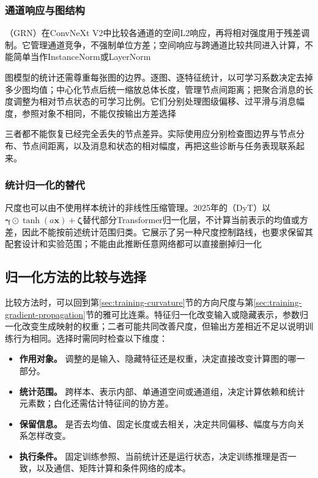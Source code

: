 \subsubsection{通道响应与图结构}
\label{sec:training-grn-qknorm}
\label{sec:training-graph-temporal-norm}
\label{sec:training-global-response-normalization}
（GRN）在ConvNeXt V2中比较各通道的空间L2响应，再将相对强度用于残差调制。它管理通道竞争，不强制单位方差；空间响应与跨通道比较共同进入计算，不能简单当作InstanceNorm或LayerNorm

图模型的统计还需尊重每张图的边界。逐图、逐特征统计，以可学习系数决定去掉多少图均值；中心化节点后统一缩放总体长度，管理节点间距离；把聚合消息的长度调整为相对节点状态的可学习比例。它们分别处理图级偏移、过平滑与消息幅度，参照对象不相同，不能仅按输出方差选择

三者都不能恢复已经完全丢失的节点差异。实际使用应分别检查图边界与节点分布、节点间距离，以及消息和状态的相对幅度，再把这些诊断与任务表现联系起来。

\subsubsection{统计归一化的替代}
\label{sec:training-normalization-substitutes}
尺度也可以由不使用样本统计的非线性压缩管理。2025年的（DyT）以$\bm\gamma\odot\tanh(a\bm x)+\bm\zeta$替代部分Transformer归一化层，不计算当前表示的均值或方差，因此不能按前述统计范围归类。它展示了另一种尺度控制路线，也要求保留其配套设计和实验范围；不能由此推断任意网络都可以直接删掉归一化

\subsection{归一化方法的比较与选择}
\label{sec:training-normalization-comparison}
比较方法时，可以回到第\ref{sec:training-curvature}节的方向尺度与第\ref{sec:training-gradient-propagation}节的雅可比连乘。特征归一化改变输入或隐藏表示，参数归一化改变生成映射的权重；二者可能共同改善尺度，但输出方差相近不足以说明训练行为相同。选择时需同时检查以下维度：
\begin{itemize}
  \item \textbf{作用对象。} 调整的是输入、隐藏特征还是权重，决定直接改变计算图的哪一部分。
  \item \textbf{统计范围。} 跨样本、表示内部、单通道空间或通道组，决定计算依赖和统计元素数；白化还需估计特征间的协方差。
  \item \textbf{保留信息。} 是否去均值、固定长度或去相关，决定共同偏移、幅度与方向关系怎样改变。
  \item \textbf{执行条件。} 固定训练参照、当前统计还是运行状态，决定训练推理是否一致，以及通信、矩阵计算和条件网络的成本。
\end{itemize}

